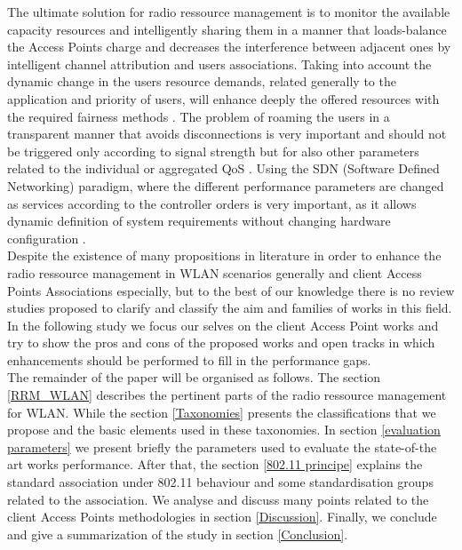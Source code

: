 \documentclass[journal,transmag]{IEEEtran}
\begin{document}
The ultimate solution for radio ressource management is to monitor the available capacity resources and intelligently sharing them in a manner that loads-balance the Access Points charge and decreases the interference between adjacent ones by intelligent channel attribution and users associations. Taking into account the dynamic change in the users resource demands, related generally to the application and priority of users, will enhance deeply the offered resources with the required fairness methods \cite{16VALI_SDN}. The problem of roaming the users in a transparent manner that avoids disconnections is very important and should not be triggered only according to signal strength but for also other parameters related to the individual or aggregated QoS \cite{14optimalAP_INFOCOM,14Odin:Programmatic_Orchestration_WiFi}. Using the SDN (Software Defined Networking) paradigm, where the different performance parameters are changed as services according to the controller orders is very important, as it allows dynamic definition of system requirements without changing hardware configuration \cite{14Odin:Programmatic_Orchestration_WiFi}. \\
Despite the existence of many propositions in literature in order to enhance the radio ressource management in WLAN scenarios generally and client Access Points Associations especially, but to the best of our knowledge there is no review studies proposed to clarify and classify the aim and families of works in this field. In the following study we focus our selves on the client Access Point works and try to show the pros and cons of the proposed works and open tracks in which enhancements should be performed to fill in the performance gaps. \\

The remainder of the paper will be organised as follows. The section \ref{RRM_WLAN} describes the pertinent parts of the radio ressource management for WLAN. While the section \ref{Taxonomies} presents the classifications that we propose and the basic elements used in these taxonomies.
In section \ref{evaluation parameters} we present briefly the parameters used to evaluate the state-of-the art works performance. After that, the section \ref{802.11 principe} explains the standard association under 802.11 behaviour and some standardisation groups related to the association. 
We analyse and discuss many points related to the client Access Points methodologies in section \ref{Discussion}. Finally, we conclude and give a summarization of the study in section \ref{Conclusion}.
\end{document}
